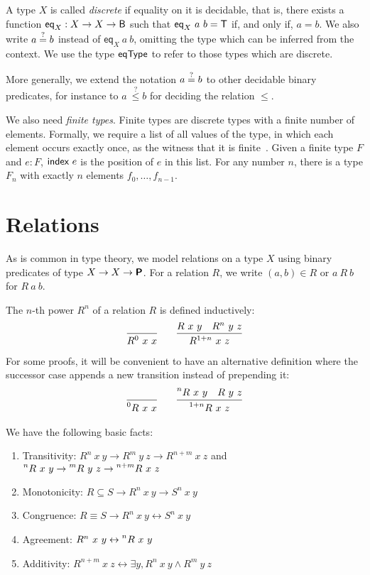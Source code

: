 A type $X$ is called \emph{discrete} if equality on it is decidable, that is, there exists a function $\textsf{eq}_X : X \rightarrow X \rightarrow \textsf{B}$ such that $\textsf{eq}_X~a~b = \mathsf{T}$ if, and only if, $a = b$. We also write $a\overset{?}{=}b$ instead of $\textsf{eq}_X~a~b$, omitting the type which can be inferred from the context. We use the type $\textsf{eqType}$ to refer to those types which are discrete.

More generally, we extend the notation $a\overset{?}{=}b$ to other decidable binary predicates, for instance to $a~\overset{?}{\le} b$ for deciding the relation $\le$.

We also need \emph{finite types}. Finite types are discrete types with a finite number of elements. Formally, we require a list of all values of the type, in which each element occurs exactly once, as the witness that it is finite~\cite{menz2016}. Given a finite type $F$ and $e : F$, $\textsf{index}~e$ is the position of $e$ in this list.
For any number $n$, there is a type $F_n$ with exactly $n$ elements $f_0, \ldots, f_{n-1}$.

\section{Relations}
As is common in type theory, we model relations on a type $X$ using binary predicates of type $X \rightarrow X \rightarrow \textsf{\bfseries P}$. 
For a relation $R$, we write $(a, b) \in R$ or $a~R~b$ for $R~a~b$. 

The $n$-th power $R^n$ of a relation $R$ is defined inductively:
\begin{align*}
  \infer{R^0~x~x}{}
  \qquad
  \infer{R^{\natS{n}}~x~z}{R~x~y\quad R^n~y~z}
\end{align*}
For some proofs, it will be convenient to have an alternative definition where the successor case appends a new transition instead of prepending it:
\begin{align*}
  \infer{\prescript{0}{}R~x~x}{}
  \qquad
  \infer{\prescript{\natS{n}}{}R~x~z}{\prescript{n}{}R~x~y\quad R~y~z}
\end{align*}

\begin{proposition}\label{prop:relpower}
  We have the following basic facts:
  \begin{enumerate}
    \item Transitivity: $R^n~x~y \rightarrow R^m~y~z \rightarrow R^{n+m}~x~z$ and $\prescript{n}{}R~x~y \rightarrow \prescript{m}{}R~y~z \rightarrow \prescript{n+m}{}R~x~z$
    \item Monotonicity: $R \subseteq S \rightarrow R^n~x~y \rightarrow S^n~x~y$
    \item Congruence: $R \equiv S \rightarrow R^n~x~y \leftrightarrow S^n~x~y$
    \item Agreement: $R^n~x~y \leftrightarrow \prescript{n}{}R~x~y$
    \item Additivity: $R^{n+m}~x~z \leftrightarrow \exists y, R^n~x~y \land R^m~y~z$
  \end{enumerate}
\end{proposition}

